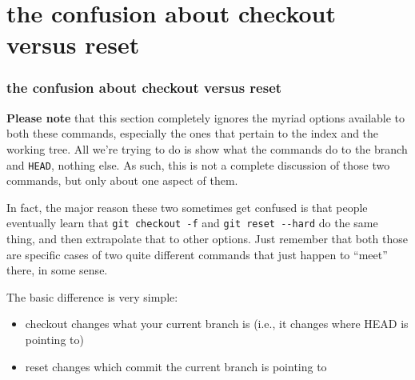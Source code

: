 \documentclass[presentation]{beamer}
\begin{document}
\section{the confusion about checkout versus reset}
\label{sec-9}
\begin{frame}
\frametitle{the confusion about checkout versus reset}
\label{sec-9-1}


\tiny
\textbf{Please note} that this section completely ignores the
myriad options available to both these commands, especially the ones that
pertain to the index and the working tree.  All we're trying to do is show
what the commands do to the branch and \texttt{HEAD}, nothing else.  As such, this is
not a complete discussion of those two commands, but only about one aspect of
them.

In fact, the major reason these two sometimes get confused is that people
eventually learn that \texttt{git checkout -f} and \texttt{git reset -{}-hard} do the same
thing, and then extrapolate that to other options.  Just remember that both
those are specific cases of two quite different commands that just happen to
``meet'' there, in some sense.

\normalsize
The basic difference is very simple:

\begin{itemize}
\item checkout changes what your current branch is (i.e., it changes where HEAD
    is pointing to)
\item reset changes which commit the current branch is pointing to
\end{itemize}
\end{frame}
\end{document}
